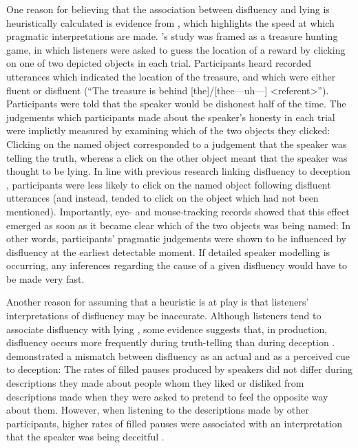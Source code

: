\documentclass[a4paper,man,natbib]{apa6}
\newcommand*{\spex}[1]{``{#1}''} %
\begin{document}
One reason for believing that the association between disfluency and lying is heuristically calculated is evidence from \citet{Loy2016}, which highlights the speed at which pragmatic interpretations are made.
\citeauthor{Loy2016}'s study was framed as a treasure hunting game, in which listeners were asked to guess the location of a reward by clicking on one of two depicted objects in each trial.
Participants heard recorded utterances which indicated the location of the treasure, and which were either fluent or disfluent (\spex{The treasure is behind [the]/[thee---uh---] \textless referent\textgreater}).
Participants were told that the speaker would be dishonest half of the time. 
The judgements which participants made about the speaker's honesty in each trial were implictly measured by examining which of the two objects they clicked:
Clicking on the named object corresponded to a judgement that the speaker was telling the truth, whereas a click on the other object meant that the speaker was thought to be lying.
In line with previous research linking disfluency to deception \citep{Zuckerman1981},  participants were less likely to click on the named object following disfluent utterances (and instead, tended to click on the object which had not been mentioned).
Importantly, eye- and mouse-tracking records showed that this effect emerged as soon as it became clear which of the two objects was being named:
In other words, participants' pragmatic judgements were shown to be influenced by disfluency at the earliest detectable moment.
If detailed speaker modelling is occurring, any inferences regarding the cause of a given disfluency would have to be made very fast.

Another reason for assuming that a heuristic is at play is that listeners' interpretations of disfluency may be inaccurate.
Although listeners tend to associate disfluency with lying \citep{Loy2016,Zuckerman1981}, some evidence suggests that, in production, disfluency occurs more frequently during truth-telling than during deception \citep{Arciuli2010markers,Arciuli2009lies,Benus2006pauses}.
\citet{DePaulo1982actual} demonstrated a  mismatch between disfluency as an actual and as a perceived cue to deception:
The rates of filled pauses produced by speakers did not differ during descriptions they made about people whom they liked or disliked from descriptions made when they were asked to pretend to feel the opposite way about them. 
However, when listening to the descriptions made by other participants, higher rates of filled pauses were associated with an interpretation that the speaker was being deceitful \citep[see also][]{loy2016lying}.
\end{document}
